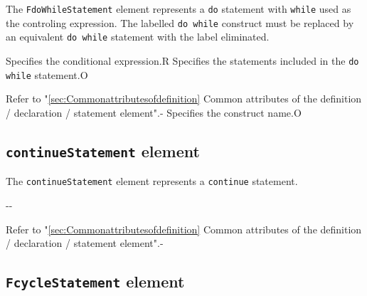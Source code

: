 The {\tt FdoWhileStatement} element represents a {\tt do} statement with {\tt while} used as the controling expression.
The labelled {\tt do while} construct must be replaced by an equivalent {\tt do while} statement with the label eliminated.


\begin{XcodeMLChildElements}
{Specifies the conditional expression.}{R}
{Specifies the statements included in the {\tt do while} statement.}{O}
\end{XcodeMLChildElements}

\begin{XcodeMLAttributes}
{Refer to "\ref{sec:Commonattributesofdefinition} Common attributes of the definition / declaration / statement element".}{-}
{Specifies the construct name.}{O}
\end{XcodeMLAttributes}


\subsection{ {\tt continueStatement} element}

The {\tt continueStatement} element represents a {\tt continue} statement.


\begin{XcodeMLChildElements}
\XcodeMLElementDef{-}
{-}{-}
\end{XcodeMLChildElements}

\begin{XcodeMLAttributes}
{Refer to "\ref{sec:Commonattributesofdefinition} Common attributes of the definition / declaration / statement element".}{-}
\end{XcodeMLAttributes}


\subsection{ {\tt FcycleStatement} element}

